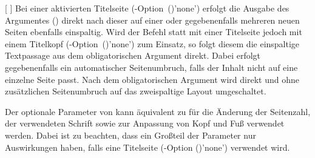 \begin{Declaration*}{}
\begin{Declaration*}{}
\begin{Declaration*}{}
\begin{Declaration}{%
  [%
  ]%
}
Bei einer aktivierten Titelseite 
(\KOMAScript-Option~()'none') 
erfolgt die Ausgabe des Argumentes () direkt nach dieser 
auf einer oder gegebenenfalls mehreren neuen Seiten ebenfalls einspaltig. Wird 
der Befehl  statt mit einer Titelseite jedoch mit 
einem Titelkopf 
(\KOMAScript-Option~()'none') zum 
Einsatz, so folgt diesem die einspaltige Textpassage aus dem obligatorischen 
Argument direkt. Dabei erfolgt gegebenenfalls ein automatischer Seitenumbruch, 
falls der Inhalt nicht auf eine einzelne Seite passt. Nach dem obligatorischen 
Argument  wird direkt und ohne zusätzlichen Seitenumbruch 
auf das zweispaltige Layout umgeschaltet.

Der optionale Parameter von  kann äquivalent zu 
 für die Änderung der Seitenzahl, der verwendeten Schrift 
sowie zur Anpassung von Kopf und Fuß verwendet werden. Dabei ist zu beachten, 
dass ein Großteil der Parameter nur Auswirkungen haben, falls eine Titelseite
(\KOMAScript-Option ()'none') 
verwendet wird.
\end{Declaration}


\end{Declaration*}
\end{Declaration*}
\end{Declaration*}
